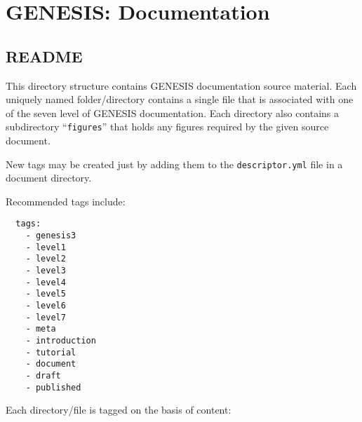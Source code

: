 \documentclass[12pt]{article}
\begin{document}
\section*{GENESIS: Documentation}

\subsection*{README}

This directory structure contains GENESIS documentation source material. Each uniquely named folder/directory contains a single file that is associated with one of the seven level of GENESIS documentation. Each directory also contains a subdirectory ``{\tt figures}'' that holds any figures required by the given source document.

New tags may be created just by adding them to the {\tt descriptor.yml} file in a document directory. 

Recommended tags include:
\begin{verbatim}
  tags:
    - genesis3
    - level1
    - level2
    - level3
    - level4
    - level5
    - level6
    - level7
    - meta
    - introduction
    - tutorial
    - document
    - draft
    - published
\end{verbatim}
Each directory/file is tagged on the basis of content:
\end{document}
